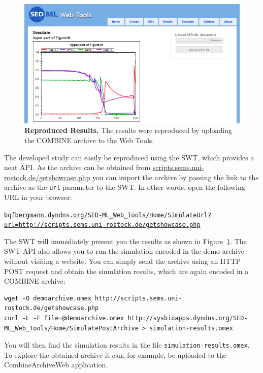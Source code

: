 \begin{figure}
\begin{center}
\includegraphics[width=.78\textwidth]{img/swt-reproduced-cropped.png}
\end{center}
\caption{\textbf{Reproduced Results.} The results were reproduced by uploading the COMBINE archive to the \sedml Web Tools.}
\label{fig:swt-repro}
\end{figure}

The developed study can easily be reproduced using the SWT, which provides a neat API.
As the archive can be obtained from \href{http://scripts.sems.uni-rostock.de/getshowcase.php}{scripts.sems.uni-rostock.de/getshowcase.php} you can import the archive by passing the link to the archive as the \texttt{url} parameter to the SWT.
In other words, open the following URL in your browser:

{\href{http://bqfbergmann.dyndns.org/SED-ML_Web_Tools/Home/SimulateUrl?url=http://scripts.sems.uni-rostock.de/getshowcase.php}{\texttt{{\tiny{bqfbergmann.dyndns.org/SED-ML\_Web\_Tools/Home/}}{\scriptsize{SimulateUrl?url=http://scripts.sems.uni-rostock.de/getshowcase.php}}}}}

The SWT will immediately present you the results as shown in Figure~\ref{fig:swt-repro}.
The SWT API also allows you to run the simulation encoded in the demo archive without visiting a website.
You can simply send the archive using an HTTP POST request and obtain the simulation results, which are again encoded in a COMBINE archive:

\begin{mdframed}[style=mddefault,frametitle={Obtain the simulation results using the API of the \sedml Web Tolls}]
\begin{verbatim}
wget -O demoarchive.omex http://scripts.sems.uni-rostock.de/getshowcase.php
curl -L -F file=@demoarchive.omex http://sysbioapps.dyndns.org/SED-ML_Web_Tools/Home/SimulatePostArchive > simulation-results.omex
\end{verbatim}
\end{mdframed}

You will then find the simulation results in the file \texttt{simulation-results.omex}.
To explore the obtained archive it can, for example, be uploaded to the CombineArchiveWeb application.

